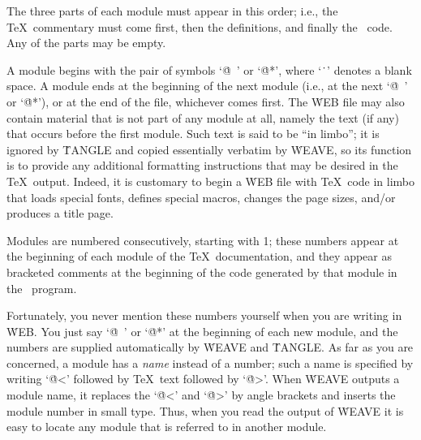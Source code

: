 \yskip\noindent The three parts of each module must appear in this order;
i.e., the \TeX\ commentary must come first, then the definitions, and
finally the \PASCAL\ code. Any of the parts may be empty.

\eject %

A module begins with the pair of symbols `\.{@\ }' or `\.{@*}', where
`\.{\ }' denotes a blank space. A module ends
at the beginning of the next module (i.e., at the next
`\.{@\ }' or `\.{@*}'), or at the end of the file, whichever comes first.
The \.{WEB} file may also contain material that is not part of any module
at all, namely the text (if any) that occurs before the first module.
Such text is said to be ``in limbo''; it is ignored by \.{TANGLE}
and copied essentially verbatim by \.{WEAVE}, so its function is to
provide any additional formatting instructions that may be desired in the
\TeX\ output. Indeed, it is customary to begin a \.{WEB} file with
\TeX\ code in limbo that loads special fonts, defines special macros,
changes the page sizes, and/or produces a title page.

Modules are numbered consecutively, starting with 1; these numbers appear
at the beginning of each module of the \TeX\ documentation, and they appear
as bracketed comments at the beginning of the code generated by that
module in the \PASCAL\ program.

Fortunately, you never mention these numbers yourself when you are writing
in \.{WEB}. You just say `\.{@\ }' or `\.{@*}' at the beginning of each
new module, and the numbers are supplied automatically by \.{WEAVE} and
\.{TANGLE}. As far as you are concerned, a module has a
{\sl name\/} instead of a number; such a name is specified by writing
`\.{@<}' followed by \TeX\ text followed by `\.{@>}'. When \.{WEAVE}
outputs a module name, it replaces the `\.{@<}' and `\.{@>}' by
angle brackets and inserts the module number in small type. Thus, when you
read the output of \.{WEAVE} it is easy to locate any module that is
referred to in another module.

